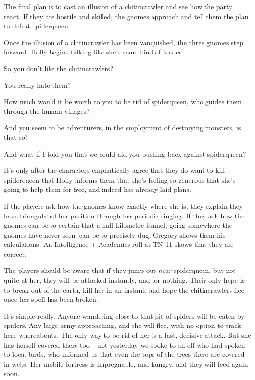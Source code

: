 \begin{multicols}{2}
The final plan is to cast an illusion of a chitincrawler and see how the party react.  If they are hostile and skilled, the gnomes approach and tell them the plan to defeat \gls{spiderqueen}.

Once the illusion of a chitincrawler has been vanquished, the three gnomes step forward.
Holly begins talking like she's some kind of trader.

\begin{speechtext}

	So you don't like the chitincrawlers?

	You really hate them?

	How much would it be worth to you to be rid of \gls{spiderqueen}, who guides them through the human villages?

	And you seem to be adventurers, in the employment of destroying monsters, is that so?

	And what if I told you that we could aid you pushing back against \gls{spiderqueen}?

\end{speechtext}

It's only after the characters emphatically agree that they do want to kill \gls{spiderqueen} that Holly informs them that she's feeling so generous that she's going to help them for free, and indeed has already laid plans.

If the players ask how the gnomes know exactly where she is, they explain they have triangulated her position through her periodic singing.
If they ask how the gnomes can be so certain that a half-kilometre tunnel, going somewhere the gnomes have never seen, can be so precisely dug, Gregory shows them his calculations.
An Intelligence + Academics roll at TN 11 shows that they are correct.

The players should be aware that if they jump out \emph{near} \gls{spiderqueen}, but not quite at her, they will be attacked instantly, and for nothing.  Their only hope is to break out of the earth, kill her in an instant, and hope the chitincrawlers flee once her spell has been broken.

\begin{speechtext}

	It's simple really.  Anyone wandering close to that pit of spiders will be eaten by spiders.  Any large army approaching, and she will flee, with no option to track here whereabouts.  The only way to be rid of her is a fast, decisive attack.  But she has herself covered there too -- not yesterday we spoke to an elf who had spoken to local birds, who informed us that even the tops of the trees there are covered in webs.  Her mobile fortress is impregnable, and hungry, and they will feed again soon.


\end{speechtext}
\end{multicols}

